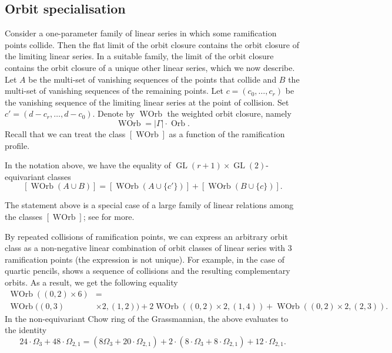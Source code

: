 \documentclass[11pt]{amsart}
\providecommand{\GL}{\operatorname{GL}}
\DeclareMathOperator{\Orb}{Orb}
\DeclareMathOperator{\WOrb}{WOrb}
\begin{document}
\subsection{Orbit specialisation}
Consider a one-parameter family of linear series in which some ramification points collide.
Then the flat limit of the orbit closure contains the orbit closure of the limiting linear series.
In a suitable family, the limit of the orbit closure contains the orbit closure of a unique other linear series, which we now describe.
Let \(A\) be the multi-set of vanishing sequences of the points that collide and \(B\) the multi-set of  vanishing sequences of the remaining points.
Let \(c = (c_0, \dots, c_r)\) be the vanishing sequence of the limiting linear series at the point of collision.
Set \(c' = (d-c_r, \dots, d-c_0)\).
Denote by \(\WOrb\) the weighted orbit closure, namely
\[ \WOrb = |\Gamma| \cdot \Orb.\]
Recall that we can treat the class \([\WOrb]\) as a function of the ramification profile.
\begin{theorem}\label{thm:introspec}
  In the notation above,  we have the equality of \(\GL(r+1) \times \GL(2)\)-equivariant classes
  \[ [\WOrb(A \cup B)] = [\WOrb(A \cup \{c'\})] + [\WOrb(B \cup \{c\})].\]
\end{theorem}
The statement above is a special case of a large family of linear relations among the classes \([\WOrb]\); see  for more.

By repeated collisions of ramification points, we can express an arbitrary orbit class as a non-negative linear combination of orbit classes of linear series with 3 ramification points (the expression is not unique).
For example, in the case of quartic pencils,  shows a sequence of collisions and the resulting complementary orbits.
As a result, we get the following equality
\[
  \begin{split}
    \WOrb((0,2) \times 6) &= \\
    \WOrb((0,3)&\times 2, (1,2)) + 2 \WOrb((0,2) \times 2, (1,4)) + \WOrb((0,2) \times 2, (2,3)).
  \end{split}
\]
In the non-equivariant Chow ring of the Grassmannian, the above evaluates to the identity
\[
  24 \cdot \Omega_3 + 48 \cdot \Omega_{2,1} =
    \left(8 \Omega_3 + 20 \cdot \Omega_{2,1}\right) + 2 \cdot \left(8 \cdot \Omega_{3} + 8 \cdot \Omega_{2,1} \right) + 12 \cdot \Omega_{2,1}.
\]
\end{document}
